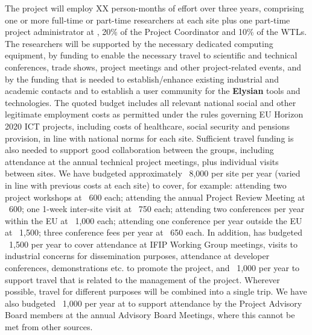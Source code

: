 \documentclass[a4paper,11pt]{article}
\newcommand{\project}[1]{\textbf{#1}\xspace}
\newcommand{\SECURITY}{\project{Elysian}}
\newcommand{\TheProject}{\SECURITY}
\begin{document}
The project will employ XX person-months of effort over three
years, comprising one or more full-time or part-time researchers at each site
plus one part-time project administrator at \SAshort{}, %
20\% of the Project Coordinator and 10\% of the WTLs. The researchers will be supported by
the necessary dedicated computing equipment,
by funding to enable the necessary travel to scientific and technical conferences, trade shows, 
project meetings and other project-related events, and by the funding that is needed to establish/enhance existing
industrial and academic contacts and to establish a user
community for the \TheProject{} tools and technologies.
%
The quoted budget includes all relevant national social and
other legitimate employment costs as permitted under the rules
governing EU Horizon 2020 ICT projects, including costs of
healthcare, social security and pensions provision, in line with national norms for each site.
%
Sufficient travel funding is also needed to support good
collaboration between the groups, including attendance at the
annual technical project meetings, plus individual visits between
sites. We have budgeted approximately \euros{}~8,000 per
site per year (varied in line with previous
costs at each site)  to cover, for example:
attending two project workshops at \euros{}~600 each;
attending the annual Project Review Meeting at \euros{}~600;
one 1-week inter-site visit at \euros{}~750 each;
attending two conferences per year within the EU at \euros{}~1,000 each;
attending one conference per year outside the EU at \euros{}~1,500;
three conference fees per year at \euros{}~650 each.
%
\noindent
In addition, \SAshort{} has budgeted \euros{}~1,500 per year to cover attendance at
IFIP Working Group meetings, visits to industrial concerns for dissemination purposes,
attendance at developer conferences, demonstrations etc. to promote the project,
and \euros~1,000 per year to support travel that is related to the management of the
project.
Wherever possible, travel for different purposes will be
combined into a single trip. We have also budgeted \euros~1,000
per year at \SAshort{} to support attendance by the Project Advisory Board members at
the annual Advisory Board Meetings, where this cannot be met from other sources.
\end{document}

